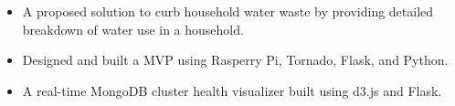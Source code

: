 \documentclass[10pt,a4paper,academicons]{altacv}
\begin{document}

\begin{itemize}
\item A proposed solution to curb household water waste by providing detailed breakdown of water use in a household.
\item Designed and built a MVP using Rasperry Pi, Tornado, Flask, and Python.
\end{itemize}
\divider

\begin{itemize}
\item A real-time MongoDB cluster health visualizer built using d3.js and Flask.
\end{itemize}
\end{document}
